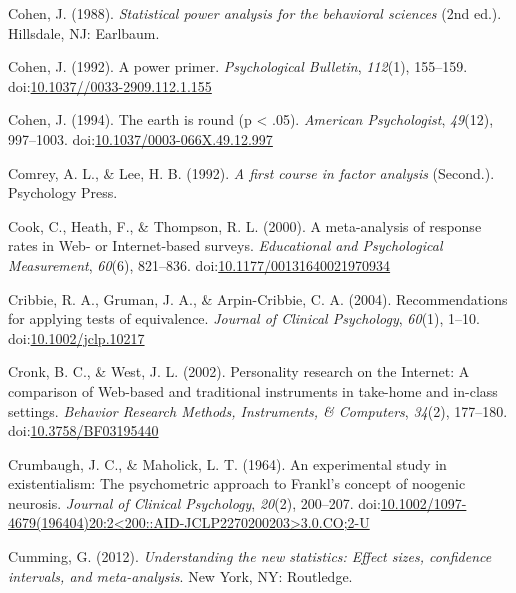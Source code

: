 \documentclass[english,man]{apa6}
\theoremstyle{definition}
\theoremstyle{definition}
\theoremstyle{definition}
\theoremstyle{remark}
\begin{document}
\hypertarget{ref-Cohen1988}{}
Cohen, J. (1988). \emph{Statistical power analysis for the behavioral
sciences} (2nd ed.). Hillsdale, NJ: Earlbaum.

\hypertarget{ref-Cohen1992a}{}
Cohen, J. (1992). A power primer. \emph{Psychological Bulletin},
\emph{112}(1), 155--159.
doi:\href{https://doi.org/10.1037//0033-2909.112.1.155}{10.1037//0033-2909.112.1.155}

\hypertarget{ref-Cohen1994}{}
Cohen, J. (1994). The earth is round (p \textless{} .05). \emph{American
Psychologist}, \emph{49}(12), 997--1003.
doi:\href{https://doi.org/10.1037/0003-066X.49.12.997}{10.1037/0003-066X.49.12.997}

\hypertarget{ref-Comrey1992}{}
Comrey, A. L., \& Lee, H. B. (1992). \emph{A first course in factor
analysis} (Second.). Psychology Press.

\hypertarget{ref-Cook2000}{}
Cook, C., Heath, F., \& Thompson, R. L. (2000). A meta-analysis of
response rates in Web- or Internet-based surveys. \emph{Educational and
Psychological Measurement}, \emph{60}(6), 821--836.
doi:\href{https://doi.org/10.1177/00131640021970934}{10.1177/00131640021970934}

\hypertarget{ref-Cribbie2004}{}
Cribbie, R. A., Gruman, J. A., \& Arpin-Cribbie, C. A. (2004).
Recommendations for applying tests of equivalence. \emph{Journal of
Clinical Psychology}, \emph{60}(1), 1--10.
doi:\href{https://doi.org/10.1002/jclp.10217}{10.1002/jclp.10217}

\hypertarget{ref-Cronk2002}{}
Cronk, B. C., \& West, J. L. (2002). Personality research on the
Internet: A comparison of Web-based and traditional instruments in
take-home and in-class settings. \emph{Behavior Research Methods,
Instruments, \& Computers}, \emph{34}(2), 177--180.
doi:\href{https://doi.org/10.3758/BF03195440}{10.3758/BF03195440}

\hypertarget{ref-Crumbaugh1964}{}
Crumbaugh, J. C., \& Maholick, L. T. (1964). An experimental study in
existentialism: The psychometric approach to Frankl's concept of
noogenic neurosis. \emph{Journal of Clinical Psychology}, \emph{20}(2),
200--207.
doi:\href{https://doi.org/10.1002/1097-4679(196404)20:2\%3C200::AID-JCLP2270200203\%3E3.0.CO;2-U}{10.1002/1097-4679(196404)20:2\textless{}200::AID-JCLP2270200203\textgreater{}3.0.CO;2-U}

\hypertarget{ref-Cumming2012}{}
Cumming, G. (2012). \emph{Understanding the new statistics: Effect
sizes, confidence intervals, and meta-analysis}. New York, NY:
Routledge.
\end{document}
